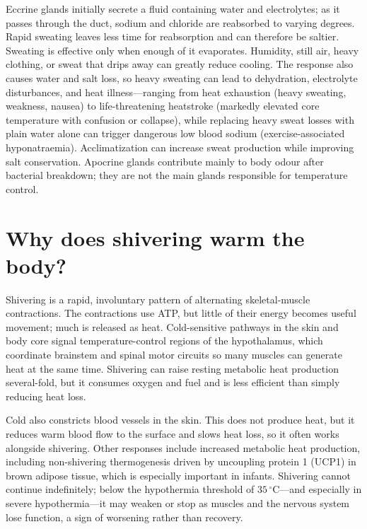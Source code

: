 \documentclass[11pt,oneside]{report}
\begin{document}
Eccrine glands initially secrete a fluid containing water and electrolytes; as
it passes through the duct, sodium and chloride are reabsorbed to varying
degrees. Rapid sweating leaves less time for reabsorption and can therefore be
saltier. Sweating is effective only when enough of it evaporates. Humidity,
still air, heavy clothing, or sweat that drips away can greatly reduce cooling.
The response also causes water and salt loss, so heavy sweating can lead to
dehydration, electrolyte disturbances, and heat illness—ranging from heat
exhaustion (heavy sweating, weakness, nausea) to life-threatening heatstroke
(markedly elevated core temperature with confusion or collapse), while replacing
heavy sweat losses with plain water alone can trigger dangerous low blood
sodium (exercise-associated hyponatraemia). Acclimatization can
increase sweat production while improving salt conservation. Apocrine glands
contribute mainly to body odour after bacterial breakdown; they are not the
main glands responsible for temperature control.

\section{Why does shivering warm the body?}

Shivering is a rapid, involuntary pattern of alternating skeletal-muscle
contractions. The contractions use ATP, but little of their energy becomes
useful movement; much is released as heat. Cold-sensitive pathways in the skin
and body core signal temperature-control regions of the hypothalamus, which
coordinate brainstem and spinal motor circuits so many muscles can generate
heat at the same time. Shivering can raise resting metabolic heat production several-fold, but
it consumes oxygen and fuel and is less efficient than simply reducing heat
loss.

Cold also constricts blood vessels in the skin. This does not produce heat, but
it reduces warm blood flow to the surface and slows heat loss, so it often
works alongside shivering. Other responses include increased metabolic heat
production, including non-shivering thermogenesis driven by uncoupling protein 1
(UCP1) in brown adipose tissue, which is especially important in infants.
Shivering cannot continue indefinitely; below the hypothermia threshold of
$35\,^{\circ}\mathrm{C}$—and especially in severe hypothermia—it may weaken or
stop as muscles and the nervous system lose function, a sign of worsening
rather than recovery.
\end{document}
